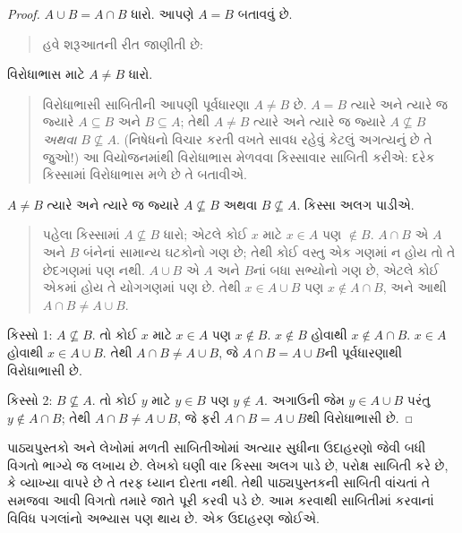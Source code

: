 \begin{proof}
  $A \cup B = A \cap B$ ધારો. આપણે $A = B$ બતાવવું છે.
  \begin{quote}
    હવે શરૂઆતની રીત જાણીતી છે:
  \end{quote}
  વિરોધાભાસ માટે $A \neq B$ ધારો.
  \begin{quote}
    વિરોધાભાસી સાબિતીની આપણી પૂર્વધારણા $A \neq
    B$ છે. $A = B$ ત્યારે અને ત્યારે જ જ્યારે $A \subseteq B$
    અને $B \subseteq A$; તેથી $A \neq B$ ત્યારે અને ત્યારે જ
    જ્યારે $A \nsubseteq B$ \emph{અથવા} $B \nsubseteq
    A$. (નિષેધનો વિચાર કરતી વખતે સાવધ રહેવું કેટલું અગત્યનું
    છે તે જુઓ!{}) આ વિયોજનમાંથી વિરોધાભાસ મેળવવા કિસ્સાવાર
    સાબિતી કરીએ: દરેક કિસ્સામાં વિરોધાભાસ મળે છે તે બતાવીએ.
  \end{quote}
  $A \neq B$ ત્યારે અને ત્યારે જ જ્યારે $A \nsubseteq B$ અથવા
  $B \nsubseteq A$. કિસ્સા અલગ પાડીએ.
  \begin{quote}
    પહેલા કિસ્સામાં $A \nsubseteq B$ ધારો; એટલે કોઈ $x$
    માટે $x \in A$ પણ $\notin B$. $A \cap B$ એ $A$ અને
    $B$ બંનેનાં સામાન્ય ઘટકોનો ગણ છે; તેથી કોઈ
    વસ્તુ એક ગણમાં ન હોય તો તે છેદગણમાં પણ નથી. $A \cup B$
    એ $A$ અને $B$નાં બધા સભ્યોનો ગણ છે, એટલે કોઈ એકમાં
    હોય તે યોગગણમાં પણ છે. તેથી $x \in A \cup B$ પણ
    $x \notin A \cap
    B$, અને આથી $A \cap B \neq A \cup B$.
  \end{quote}

  કિસ્સો 1: $A \nsubseteq B$. તો કોઈ $x$ માટે $x \in A$
  પણ $x \notin
  B$. $x \notin B$ હોવાથી $x \notin A \cap B$. $x \in A$
  હોવાથી $x \in A \cup B$. તેથી $A \cap B \neq A \cup B$,
  જે $A \cap B = A \cup B$ની પૂર્વધારણાથી વિરોધાભાસી છે.

  કિસ્સો 2: $B \nsubseteq A$. તો કોઈ $y$ માટે $y \in B$
  પણ $y \notin
  A$. અગાઉની જેમ $y \in A \cup B$ પરંતુ $y \notin A \cap B$;
  તેથી $A \cap B \neq A \cup B$, જે ફરી $A \cap B = A \cup
  B$થી વિરોધાભાસી છે.
\end{proof}
\endgroup


\begingroup
\makeatletter{}\makeatother

\label{guunit:OLP-0610}


પાઠ્યપુસ્તકો અને લેખોમાં મળતી સાબિતીઓમાં અત્યાર સુધીના
ઉદાહરણો જેવી બધી વિગતો ભાગ્યે જ લખાય છે. લેખકો ઘણી વાર
કિસ્સા અલગ પાડે છે, પરોક્ષ સાબિતી કરે છે, કે વ્યાખ્યા વાપરે છે
તે તરફ ધ્યાન દોરતા નથી. તેથી પાઠ્યપુસ્તકની સાબિતી વાંચતાં
તે સમજવા આવી વિગતો તમારે જાતે પૂરી કરવી પડે છે. આમ કરવાથી
સાબિતીમાં કરવાનાં વિવિધ પગલાંનો અભ્યાસ પણ થાય છે. એક
ઉદાહરણ જોઈએ.

